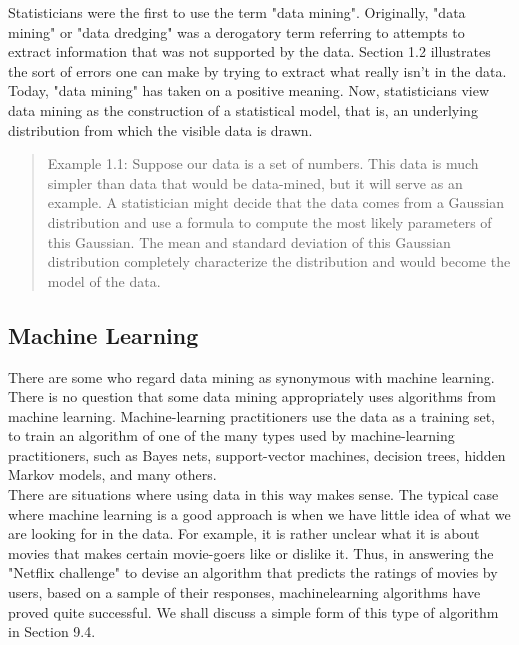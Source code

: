 \documentclass[a4paper, 11pt]{article} %
\begin{document}
Statisticians were the first to use the term "data mining". Originally, "data mining" or "data dredging" was a derogatory term referring to attempts to extract information that was not supported by the data. Section 1.2 illustrates the sort of errors one can make by trying to extract what really isn't in the data.\\

Today, "data mining" has taken on a positive meaning. Now, statisticians view data mining as the construction of a statistical model, that is, an underlying distribution from which the visible data is drawn.

\begin{quote}
Example 1.1: Suppose our data is a set of numbers. This data is much
simpler than data that would be data-mined, but it will serve as an example. A statistician might decide that the data comes from a Gaussian distribution and use a formula to compute the most likely parameters of this Gaussian. The mean and standard deviation of this Gaussian distribution completely characterize the distribution and would become the model of the data.
\end{quote}

\subsection{Machine Learning}

There are some who regard data mining as synonymous with machine learning.
There is no question that some data mining appropriately uses algorithms from
machine learning. Machine-learning practitioners use the data as a training set,
to train an algorithm of one of the many types used by machine-learning practitioners, such as Bayes nets, support-vector machines, decision trees, hidden
Markov models, and many others.\\

There are situations where using data in this way makes sense. The typical
case where machine learning is a good approach is when we have little idea of
what we are looking for in the data. For example, it is rather unclear what
it is about movies that makes certain movie-goers like or dislike it. Thus,
in answering the "Netflix challenge" to devise an algorithm that predicts the
ratings of movies by users, based on a sample of their responses, machinelearning
algorithms have proved quite successful. We shall discuss a simple
form of this type of algorithm in Section 9.4.\\
\end{document}

